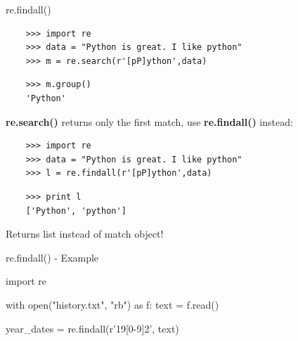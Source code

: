 \documentclass[xcolor=table,10pt,handout]{beamer}
\begin{document}
\begin{frame}[fragile]{re.findall()}

  \begin{verbatim}
    >>> import re
    >>> data = "Python is great. I like python"
    >>> m = re.search(r'[pP]ython',data)
  \end{verbatim}
  \pause
  \vspace{-10pt}
  \begin{verbatim} 
    >>> m.group()
    'Python'
  \end{verbatim}

  \bigskip
  \pause
  \begin{arrowlist}
    \item  \textbf{re.search()} returns only the first match, use
      \textbf{re.findall()} instead:
  \end{arrowlist}
  \bigskip
  \pause

  \begin{verbatim}
    >>> import re
    >>> data = "Python is great. I like python"
    >>> l = re.findall(r'[pP]ython',data)
  \end{verbatim}
  \pause
  \vspace{-10pt}
  \begin{verbatim} 
    >>> print l
    ['Python', 'python']
  \end{verbatim}

  \bigskip
  \pause
  \begin{arrowlist}
    \item  Returns list instead of match object!
  \end{arrowlist}


\end{frame}


\begin{frame}[fragile]{re.findall() - Example}

  \begin{mlinepython}
    import re

    with open("history.txt", "rb") as f:
        text = f.read()

    year_dates = re.findall(r'19[0-9]{2}', text)
  \end{mlinepython}
 
\end{frame}
\end{document}
